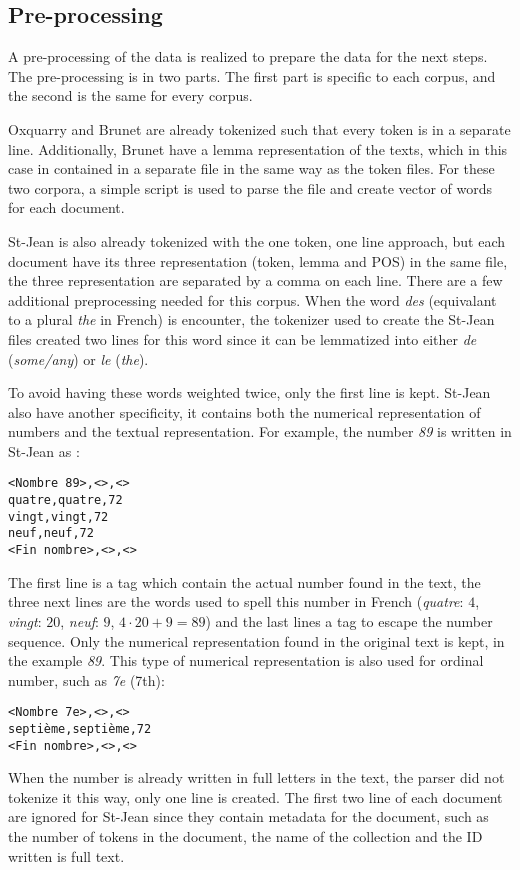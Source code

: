 \subsection{Pre-processing}

A pre-processing of the data is realized to prepare the data for the next steps.
The pre-processing is in two parts.
The first part is specific to each corpus, and the second is the same for every corpus.

Oxquarry and Brunet are already tokenized such that every token is in a separate line.
Additionally, Brunet have a lemma representation of the texts, which in this case in contained in a separate file in the same way as the token files.
For these two corpora, a simple script is used to parse the file and create vector of words for each document.

St-Jean is also already tokenized with the one token, one line approach, but each document have its three representation (token, lemma and POS) in the same file, the three representation are separated by a comma on each line.
There are a few additional preprocessing needed for this corpus.
When the word \textit{des} (equivalant to a plural \textit{the} in French) is encounter, the tokenizer used to create the St-Jean files created two lines for this word since it can be lemmatized into either \textit{de} (\textit{some/any}) or \textit{le} (\textit{the}).

To avoid having these words weighted twice, only the first line is kept.
St-Jean also have another specificity, it contains both the numerical representation of numbers and the textual representation.
For example, the number \textit{89} is written in St-Jean as :
\begin{verbatim}
<Nombre 89>,<>,<>
quatre,quatre,72
vingt,vingt,72
neuf,neuf,72
<Fin nombre>,<>,<>
\end{verbatim}
The first line is a tag which contain the actual number found in the text, the three next lines are the words used to spell this number in French (\textit{quatre}: $4$, \textit{vingt}: $20$, \textit{neuf}: $9$, $4 \cdot 20 + 9 = 89$) and the last lines a tag to escape the number sequence.
Only the numerical representation found in the original text is kept, in the example \textit{89}.
This type of numerical representation is also used for ordinal number, such as \textit{7e} (7th):
\begin{verbatim}
<Nombre 7e>,<>,<>
septième,septième,72
<Fin nombre>,<>,<>
\end{verbatim}
When the number is already written in full letters in the text, the parser did not tokenize it this way, only one line is created.
The first two line of each document are ignored for St-Jean since they contain metadata for the document, such as the number of tokens in the document, the name of the collection and the ID written is full text.

